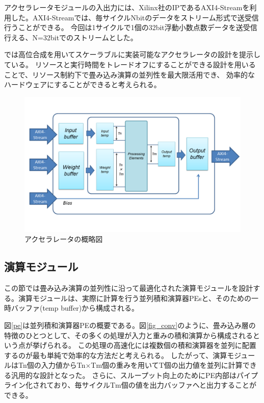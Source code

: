 アクセラレータモジュールの入出力には、Xilinx社のIPであるAXI4-Streamを利用した。AXI4-Streamでは、毎サイクルNbitのデータをストリーム形式で送受信行うことができる。
今回は1サイクルで1個の32bit浮動小数点数データを送受信行える、N=32bitでのストリームとした。

\cite{fpgaopt}では高位合成を用いてスケーラブルに実装可能なアクセラレータの設計を提示している。
リソースと実行時間をトレードオフにすることができる設計を用いることで、リソース制約下で畳み込み演算の並列性を最大限活用でき、
効率的なハードウェアにすることができると考えられる。

\begin{figure}[ht]  
 \begin{center}   
   \includegraphics[bb=0 0 720 420, width=1.0\columnwidth]{img/hw.png}
  \caption{アクセラレータの概略図}
  \label{hw}  
 \end{center}
\end{figure}


 \subsection{演算モジュール}
この節では畳み込み演算の並列性に沿って最適化された演算モジュールを設計する。演算モジュールは、実際に計算を行う並列積和演算器PEsと、そのための一時バッファ(temp buffer)から構成される。

図\ref{pe}は並列積和演算器PEの概要である。図\ref{fig_conv}のように、畳み込み層の特徴のひとつとして、その多くの処理が入力と重みの積和演算から構成されるという点が挙げられる。
この処理の高速化には複数個の積和演算器を並列に配置するのが最も単純で効率的な方法だと考えられる。
したがって、演算モジュールはTn個の入力値からTn×Tm個の重みを用いてT個の出力値を並列に計算できる汎用的な設計となった。
さらに、スループット向上のためにPE内部はパイプライン化されており、毎サイクルTm個の値を出力バッファへと出力することができる。

